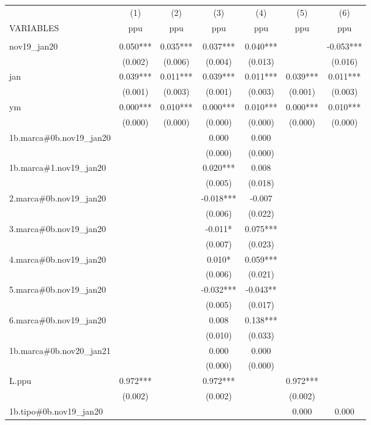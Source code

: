 \begin{tabular}{lcccccc} \hline
 & (1) & (2) & (3) & (4) & (5) & (6) \\
VARIABLES & ppu & ppu & ppu & ppu & ppu & ppu \\ \hline
 &  &  &  &  &  &  \\
nov19\_jan20 & 0.050*** & 0.035*** & 0.037*** & 0.040*** &  & -0.053*** \\
 & (0.002) & (0.006) & (0.004) & (0.013) &  & (0.016) \\
jan & 0.039*** & 0.011*** & 0.039*** & 0.011*** & 0.039*** & 0.011*** \\
 & (0.001) & (0.003) & (0.001) & (0.003) & (0.001) & (0.003) \\
ym & 0.000*** & 0.010*** & 0.000*** & 0.010*** & 0.000*** & 0.010*** \\
 & (0.000) & (0.000) & (0.000) & (0.000) & (0.000) & (0.000) \\
1b.marca\#0b.nov19\_jan20 &  &  & 0.000 & 0.000 &  &  \\
 &  &  & (0.000) & (0.000) &  &  \\
1b.marca\#1.nov19\_jan20 &  &  & 0.020*** & 0.008 &  &  \\
 &  &  & (0.005) & (0.018) &  &  \\
2.marca\#0b.nov19\_jan20 &  &  & -0.018*** & -0.007 &  &  \\
 &  &  & (0.006) & (0.022) &  &  \\
3.marca\#0b.nov19\_jan20 &  &  & -0.011* & 0.075*** &  &  \\
 &  &  & (0.007) & (0.023) &  &  \\
4.marca\#0b.nov19\_jan20 &  &  & 0.010* & 0.059*** &  &  \\
 &  &  & (0.006) & (0.021) &  &  \\
5.marca\#0b.nov19\_jan20 &  &  & -0.032*** & -0.043** &  &  \\
 &  &  & (0.005) & (0.017) &  &  \\
6.marca\#0b.nov19\_jan20 &  &  & 0.008 & 0.138*** &  &  \\
 &  &  & (0.010) & (0.033) &  &  \\
1b.marca\#0b.nov20\_jan21 &  &  & 0.000 & 0.000 &  &  \\
 &  &  & (0.000) & (0.000) &  &  \\
L.ppu & 0.972*** &  & 0.972*** &  & 0.972*** &  \\
 & (0.002) &  & (0.002) &  & (0.002) &  \\
1b.tipo\#0b.nov19\_jan20 &  &  &  &  & 0.000 & 0.000 \\

\end{tabular}
